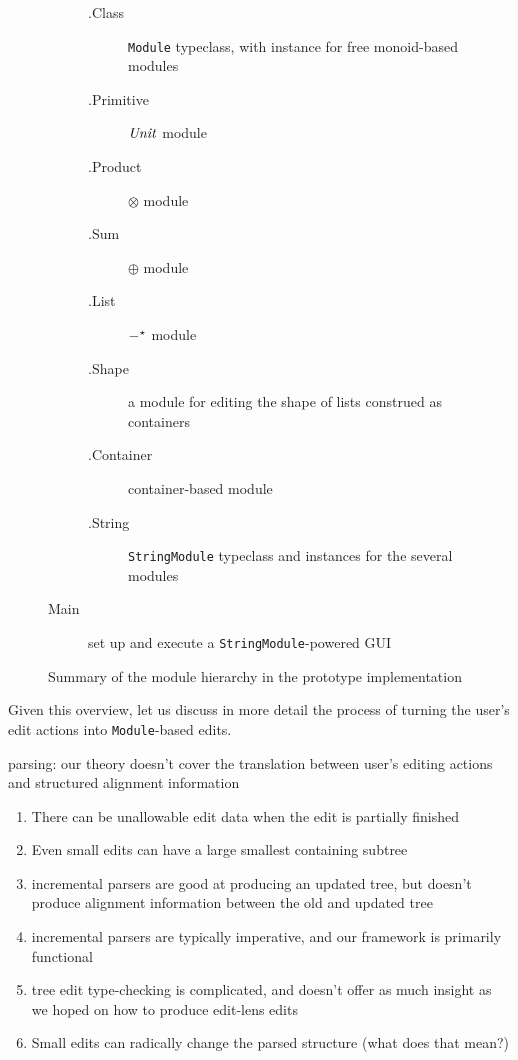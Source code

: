 \begin{figure}
\begin{description}
            \begin{description}
                \item[.Class] \texttt{Module} typeclass, with instance for
                    free monoid-based modules
                \item[.Primitive] $\mathit{Unit}$ module
                \item[.Product] $\otimes$ module
                \item[.Sum] $\oplus$ module
                \item[.List] $-^\star$ module
                \item[.Shape] a module for editing the shape of lists
                    construed as containers
                \item[.Container] container-based module
                \item[.String] \texttt{StringModule} typeclass and instances
                    for the several modules
            \end{description}
        \item[Main] set up and execute a \texttt{StringModule}-powered GUI
    \end{description}
    \caption{Summary of the module hierarchy in the prototype
    implementation}
    \label{fig:module-hierarchy}
\end{figure}

Given this overview, let us discuss in more detail the process of turning
the user's edit actions into \texttt{Module}-based edits.

parsing: our theory doesn't cover the translation between user's editing actions and structured alignment information
\begin{enumerate}
    \item There can be unallowable edit data when the edit is partially finished
    \item Even small edits can have a large smallest containing subtree
    \item incremental parsers are good at producing an updated tree, but doesn't produce alignment information between the old and updated tree
    \item incremental parsers are typically imperative, and our framework is primarily functional
    \item tree edit type-checking is complicated, and doesn't offer as much insight as we hoped on how to produce edit-lens edits
    \item Small edits can radically change the parsed structure (what does that mean?)
\end{enumerate}

